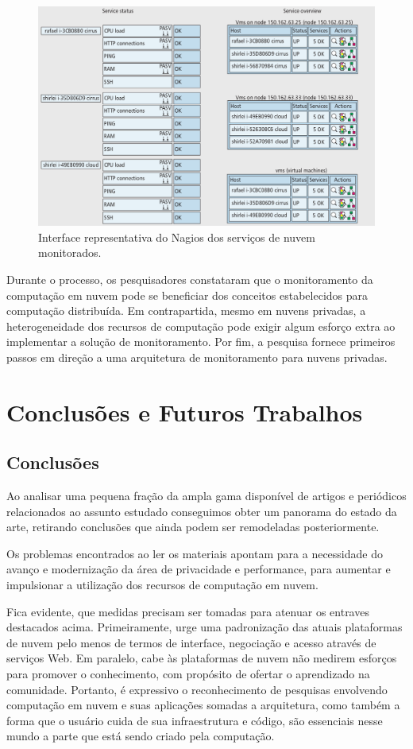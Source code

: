 \documentclass[12pt]{article}
\begin{document}
\begin{figure}[H]
    \includegraphics[width=\linewidth]{interface.png}
    \caption{Interface representativa do Nagios dos serviços de nuvem monitorados.}
\end{figure}

Durante o processo, os pesquisadores constataram que o monitoramento da computação em nuvem pode se beneficiar dos conceitos estabelecidos para computação distribuída. Em contrapartida, mesmo em nuvens privadas, a heterogeneidade dos recursos de computação pode exigir algum esforço extra ao implementar a solução de monitoramento. Por fim, a pesquisa fornece primeiros passos em direção a uma arquitetura de monitoramento para nuvens privadas. 

\section{Conclusões e Futuros Trabalhos}

\subsection{Conclusões}
Ao analisar uma pequena fração da ampla gama disponível de artigos e periódicos relacionados ao assunto estudado conseguimos obter um panorama do estado da arte, retirando conclusões que ainda podem ser remodeladas posteriormente.

Os problemas encontrados ao ler os materiais apontam para a necessidade do avanço e modernização da área de privacidade e performance, para aumentar e impulsionar a utilização dos recursos de computação em nuvem.

Fica evidente, que medidas precisam ser tomadas para atenuar os entraves destacados acima. Primeiramente, urge uma padronização das atuais plataformas de nuvem pelo menos de termos de interface, negociação e acesso através de serviços Web. Em paralelo, cabe às plataformas de nuvem não medirem esforços para promover o conhecimento, com propósito de ofertar o aprendizado na comunidade. Portanto, é expressivo o reconhecimento de pesquisas envolvendo computação em nuvem e suas aplicações somadas a arquitetura, como também a forma que o usuário cuida de sua infraestrutura e código, são essenciais nesse mundo a parte que está sendo criado pela computação.
\end{document}
